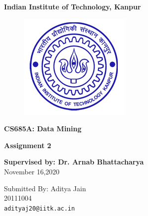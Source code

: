 \documentclass[12pt]{article}
\begin{document}
	\begin{titlepage}
		\begin{center}
			\textbf{\LARGE \vspace*{15pt}Indian Institute of Technology, Kanpur}
		\end{center}
		\begin{figure}[h]
			\centering
			\includegraphics[scale=0.7]{images/bluelog.jpg}
		\end{figure}
		\vspace{1cm}
		\begin{center}
			\textbf{\LARGE CS685A: Data Mining}
			
			\bigskip
			\textbf{\LARGE Assignment 2\\}
		\end{center}
		
		
		\begin{center}
			\vspace{1 cm}
			\Large
			\textbf{Supervised by: Dr. Arnab Bhattacharya}\\
			\vspace{30pt}
			November 16,2020
		\end{center}
		
		
		\bigskip
		\vspace{1cm}
		\centering
		\large
		Submitted By:
		Aditya Jain\\
		20111004\\
		\texttt{adityaj20@iitk.ac.in}\\
		
		
		
	\end{titlepage}
	\newpage
	
	\restoregeometry
	\renewcommand*\contentsname{\centering Table of Contents \bigskip}
	\tableofcontents
	
	\newpage
\end{document}

